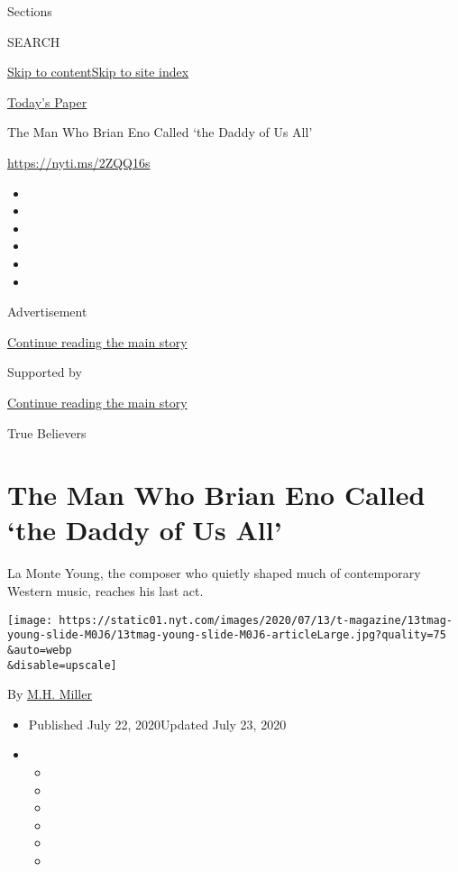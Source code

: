 Sections

SEARCH

\protect\hyperlink{site-content}{Skip to
content}\protect\hyperlink{site-index}{Skip to site index}

\href{https://myaccount.nytimes.com/auth/login?response_type=cookie\&client_id=vi}{}

\href{https://www.nytimes.com/section/todayspaper}{Today's Paper}

The Man Who Brian Eno Called `the Daddy of Us All'

\url{https://nyti.ms/2ZQQ16s}

\begin{itemize}
\item
\item
\item
\item
\item
\item
\end{itemize}

Advertisement

\protect\hyperlink{after-top}{Continue reading the main story}

Supported by

\protect\hyperlink{after-sponsor}{Continue reading the main story}

True Believers

\hypertarget{the-man-who-brian-eno-called-the-daddy-of-us-all}{%
\section{The Man Who Brian Eno Called `the Daddy of Us
All'}\label{the-man-who-brian-eno-called-the-daddy-of-us-all}}

La Monte Young, the composer who quietly shaped much of contemporary
Western music, reaches his last act.

\texttt{[image: https://static01.nyt.com/images/2020/07/13/t-magazine/13tmag-young-slide-M0J6/13tmag-young-slide-M0J6-articleLarge.jpg?quality=75\\\&auto=webp\\\&disable=upscale]}

By \href{https://www.nytimes.com/by/m-h-miller}{M.H. Miller}

\begin{itemize}
\item
  Published July 22, 2020Updated July 23, 2020
\item
  \begin{itemize}
  \item
  \item
  \item
  \item
  \item
  \item
  \end{itemize}
\end{itemize}

